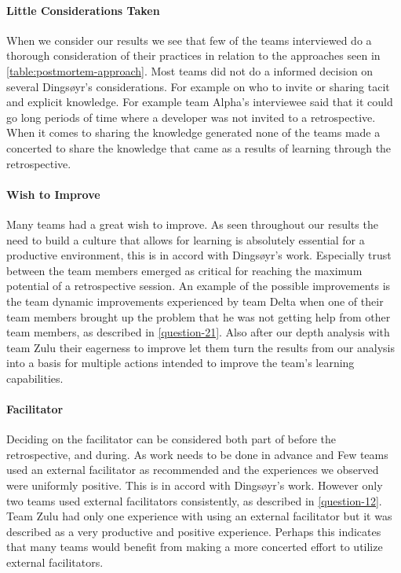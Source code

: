 \paragraph{Little Considerations Taken}
When we consider our results we see that few of the teams interviewed do a thorough consideration of their practices in relation to the approaches seen in \autoref{table:postmortem-approach}. Most teams did not do a informed decision on several Dingsøyr's considerations. For example on who to invite or sharing tacit and explicit knowledge. For example team Alpha's interviewee said that it could go long periods of time where a developer was not invited to a retrospective. When it comes to sharing the knowledge generated none of the teams made a concerted to share the knowledge that came as a results of learning through the retrospective.

\paragraph{Wish to Improve}
Many teams had a great wish to improve. As seen throughout our results the need to build a culture that allows for learning is absolutely essential for a productive environment, this is in accord with  Dingsøyr's work. Especially trust between the team members emerged as critical for reaching the maximum potential of a retrospective session. An example of the possible improvements is the team dynamic improvements experienced by team Delta when one of their team members brought up the problem that he was not getting help from other team members, as described in \autoref{question-21}. Also after our depth analysis with team Zulu their eagerness to improve let them turn the results from our analysis into a basis for multiple actions intended to improve the team's learning capabilities. 

\paragraph{Facilitator}
\label{section:facilitator}
Deciding on the facilitator can be considered both part of before the retrospective, and during. As work needs to be done in advance and Few teams used an external facilitator as recommended and the experiences we observed were uniformly positive. This is in accord with Dingsøyr's work. However only two teams used external facilitators consistently, as described in \autoref{question-12}. Team Zulu had only one experience with using an external facilitator but it was described as a very productive and positive experience. Perhaps this indicates that many teams would benefit from making a more concerted effort to utilize external facilitators. 



